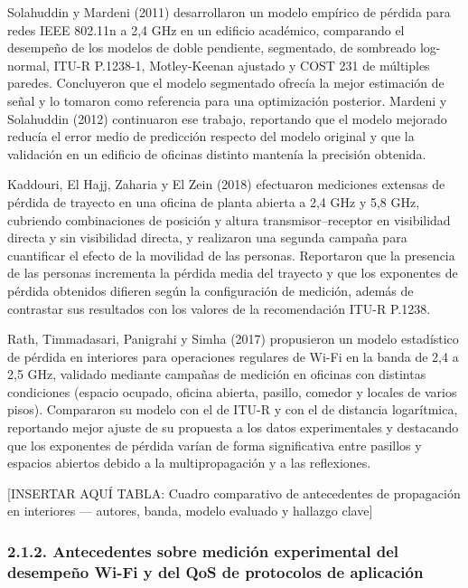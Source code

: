 \documentclass[
  12pt,
]{article}
\begin{document}
Solahuddin y Mardeni (2011) desarrollaron un modelo empírico de pérdida
para redes IEEE 802.11n a 2,4 GHz en un edificio académico, comparando
el desempeño de los modelos de doble pendiente, segmentado, de sombreado
log-normal, ITU-R P.1238-1, Motley-Keenan ajustado y COST 231 de
múltiples paredes. Concluyeron que el modelo segmentado ofrecía la mejor
estimación de señal y lo tomaron como referencia para una optimización
posterior. Mardeni y Solahuddin (2012) continuaron ese trabajo,
reportando que el modelo mejorado reducía el error medio de predicción
respecto del modelo original y que la validación en un edificio de
oficinas distinto mantenía la precisión obtenida.

Kaddouri, El Hajj, Zaharia y El Zein (2018) efectuaron mediciones
extensas de pérdida de trayecto en una oficina de planta abierta a 2,4
GHz y 5,8 GHz, cubriendo combinaciones de posición y altura
transmisor–receptor en visibilidad directa y sin visibilidad directa, y
realizaron una segunda campaña para cuantificar el efecto de la
movilidad de las personas. Reportaron que la presencia de las personas
incrementa la pérdida media del trayecto y que los exponentes de pérdida
obtenidos difieren según la configuración de medición, además de
contrastar sus resultados con los valores de la recomendación ITU-R
P.1238.

Rath, Timmadasari, Panigrahi y Simha (2017) propusieron un modelo
estadístico de pérdida en interiores para operaciones regulares de Wi-Fi
en la banda de 2,4 a 2,5 GHz, validado mediante campañas de medición en
oficinas con distintas condiciones (espacio ocupado, oficina abierta,
pasillo, comedor y locales de varios pisos). Compararon su modelo con el
de ITU-R y con el de distancia logarítmica, reportando mejor ajuste de
su propuesta a los datos experimentales y destacando que los exponentes
de pérdida varían de forma significativa entre pasillos y espacios
abiertos debido a la multipropagación y a las reflexiones.

{[}INSERTAR AQUÍ TABLA: Cuadro comparativo de antecedentes de
propagación en interiores — autores, banda, modelo evaluado y hallazgo
clave{]}

\subsubsection{2.1.2. Antecedentes sobre medición experimental del
desempeño Wi-Fi y del QoS de protocolos de
aplicación}\label{antecedentes-sobre-mediciuxf3n-experimental-del-desempeuxf1o-wi-fi-y-del-qos-de-protocolos-de-aplicaciuxf3n}
\end{document}
